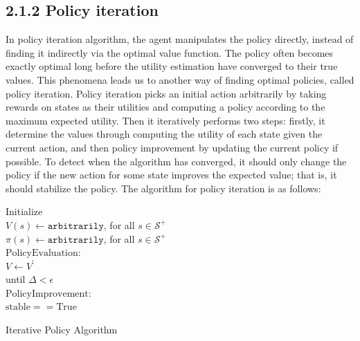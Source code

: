 \documentclass[a4paper, 12pt]{report}
\begin{document}
\subsection*{2.1.2 Policy iteration}

In policy iteration algorithm, the agent manipulates the policy directly, instead of finding it indirectly via the optimal value function. 
The policy often becomes exactly optimal long before the utility estimation have converged to their true values. This phenomena leads us to another way of finding optimal policies, called policy iteration. Policy iteration picks an initial action arbitrarily by taking rewards on states as
their utilities and computing a policy according to the maximum expected
utility. Then it iteratively performs two steps: firstly, it determine the values through
computing the utility of each state given the current action, and then policy improvement by updating the current policy if possible. 
To detect when the algorithm has converged, it should only change the policy if the new action for some state improves the expected value; that is, it should stabilize the policy.
The algorithm for policy iteration is as follows:

\begin{algorithm}[H]
Initialize \\
$V(s) \gets \texttt{arbitrarily}$, for all $s \in \mathcal S^+$\\
$\pi(s) \gets \texttt{arbitrarily}$, for all $s \in \mathcal S^+$\\
$\mathrm{Policy Evaluation:}$\\
$V \gets V^{'}$\\
until {$\Delta < \epsilon$}\\
$\mathrm{Policy Improvement:}$\\
$\mathrm{stable == True}$\\
\caption{Iterative Policy Algorithm}
\end{algorithm}
\end{document}
